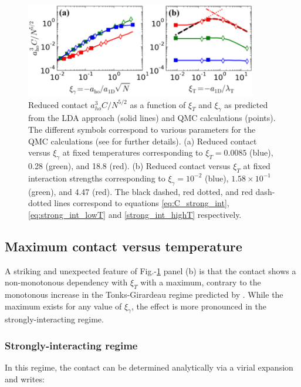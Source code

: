 \begin{figure}
    \centering
    \includegraphics[width=0.9\textwidth]{Fig/Chapter5/BS_LDA_vs_Bethe.PNG}
    \caption{Reduced contact $a_{ho}^3 C / N^{5/2}$ as a function of $\xi_T$ and $\xi_{\gamma}$ as predicted from the LDA approach (solid lines) and QMC calculations (points). The different symbols correspond to various parameters for the QMC calculations (see \cite{yao2018tan} for further details). (a) Reduced contact versus $\xi_{\gamma}$ at fixed temperatures corresponding to $\xi_T = 0.0085$ (blue), 0.28 (green), and 18.8 (red). (b) Reduced contact versus $\xi_T$  at fixed interaction strengths corresponding to $\xi_\gamma = 10^{-2}$ (blue), $1.58 \times 10^{-1}$ (green), and 4.47 (red). The black dashed, red dotted, and red dash-dotted lines correspond to equations \ref{eq:C_strong_int}, \ref{eq:strong_int_lowT} and \ref{strong_int_highT} respectively.}
    \label{fig:C_theo}
\end{figure}

\subsection{Maximum contact versus temperature}

A striking and unexpected feature of Fig.-\ref{fig:C_theo} panel (b) is that the contact shows a non-monotonous dependency with $\xi_T$ with a maximum, contrary to the monotonous increase in the Tonks-Girardeau regime predicted by \cite{vignolo2013universal}. While the maximum exists for any value of $\xi_{\gamma}$, the effect is more pronounced in the strongly-interacting regime. 

\subsubsection{Strongly-interacting regime}

In this regime, the contact can be determined analytically via a virial expansion \cite{vignolo2013universal} and writes:

